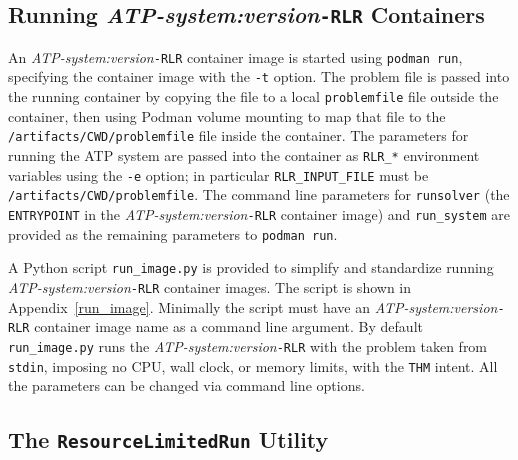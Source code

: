 \documentclass{easychair}
\begin{document}
\subsection{Running {\em ATP-system:version}{\tt -RLR} Containers}
\label{Running}


An {\em ATP-system:version}{\tt -RLR} container image is started using {\tt podman run}, specifying 
the container image with the {\tt -t} option.
The problem file is passed into the running container by copying the file to a local 
{\tt problemfile} file outside the container, then using Podman volume mounting to map that file 
to the {\tt /artifacts/CWD/problemfile} file inside the container.
The parameters for running the ATP system are passed into the container as {\tt RLR\_*} 
environment variables using the {\tt -e} option; in particular {\tt RLR\_INPUT\_FILE} must be 
{\tt /artifacts/CWD/problemfile}.
The command line parameters for {\tt runsolver} (the {\tt ENTRYPOINT} in the 
{\em ATP-system:version}{\tt -RLR} container image) and {\tt run\_system} are provided as the
remaining parameters to {\tt podman run}.

A Python script {\tt run\_image.py} is provided to simplify and standardize running 
{\em ATP-system:version}{\tt -RLR} container images.
The script is shown in Appendix~\ref{run_image}.
Minimally the script must have an {\em ATP-system:version}{\tt -RLR} container image name as a 
command line argument.
By default {\tt run\_image.py} runs the {\em ATP-system:version}{\tt -RLR} with the problem 
taken from {\tt stdin}, imposing no CPU, wall clock, or memory limits, with the {\tt THM} intent.
All the parameters can be changed via command line options.

\subsection{The {\tt ResourceLimitedRun} Utility}
\label{RLR}
\end{document}
